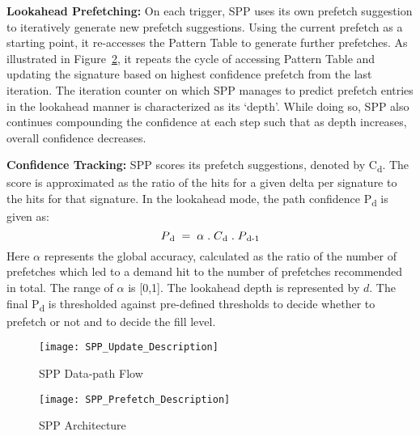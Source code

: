 \noindent \textbf{Lookahead Prefetching:} On each trigger, SPP uses
its own prefetch suggestion to iteratively generate new prefetch
suggestions.  Using the current prefetch as a starting point, it
re-accesses the Pattern Table to generate further prefetches. As
illustrated in Figure~\ref{fig:spp_structure}, it repeats the cycle of
accessing Pattern Table and updating the signature based on highest
confidence prefetch from the last iteration. The iteration counter on
which SPP manages to predict prefetch entries in the lookahead manner
is characterized as its `depth'. While doing so, SPP also continues
compounding the confidence at each step such that as depth increases,
overall confidence decreases.

\noindent \textbf{Confidence Tracking:} SPP scores its prefetch
suggestions, denoted by C\textsubscript{d}.  The score is approximated
as the ratio of the hits for a given delta per signature to the hits
for that signature. In the lookahead mode, the path confidence
P\textsubscript{d} is given as:
$$P\textsubscript{d} \;=\; \alpha \;.\; C\textsubscript{d} \;.\;
P\textsubscript{d-1}$$ Here $\alpha$ represents the global accuracy,
calculated as the ratio of the number of prefetches which led to a
demand hit to the number of prefetches recommended in total. The range
of $\alpha$ is [0,1].  The lookahead depth is represented by $d$. The final
P\textsubscript{d} is thresholded against pre-defined thresholds to
decide whether to prefetch or not and to decide the fill level.

\begin{figure}
  \begin{center}
  \texttt{[image: SPP\_Update\_Description]}
  \caption{SPP Data-path Flow}
  \label{fig:spp_update}
  \end{center}
\end{figure}


\begin{figure}
  \begin{center}
  \texttt{[image: SPP\_Prefetch\_Description]}
  \caption{SPP Architecture}
  \label{fig:spp_structure}
  \end{center}
\end{figure}

